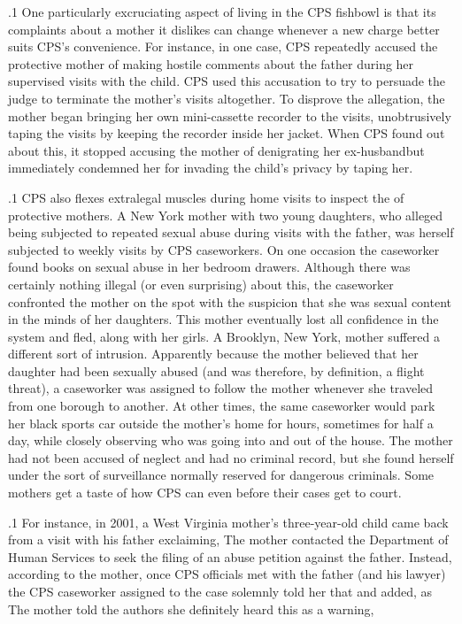\documentclass[11pt, twoside]{article}
\begin{document}
{\p.1{%
One particularly excruciating aspect of living in the CPS fishbowl is
that its complaints about a mother it dislikes can change whenever a new
charge better suits CPS's convenience. For instance, in one case, CPS
repeatedly accused the protective mother of making hostile comments
about the father during her supervised visits with the child. CPS used
this accusation to try to persuade the judge to terminate the mother's visits altogether. To disprove the allegation, the mother began bringing her
own mini-cassette recorder to the visits, unobtrusively taping the visits
by keeping the recorder inside her jacket. When CPS found out about
this, it stopped accusing the mother of denigrating her
ex-husband\mdash{}but immediately condemned her for invading the child's privacy by
taping her.
}%

\p.1{%
CPS also flexes extralegal muscles during home visits to inspect the
 of protective mothers. A New York mother with
two young daughters, who alleged being subjected to repeated sexual
abuse during visits with the father, was herself subjected to weekly  visits by CPS caseworkers. On one occasion the caseworker found
books on sexual abuse in her bedroom drawers. Although there was certainly nothing illegal (or even surprising) about this, the caseworker
confronted the mother on the spot with the suspicion that she was
 sexual content in the minds of her daughters. This mother
eventually lost all confidence in the system and fled, along with her girls.
A Brooklyn, New York, mother suffered a different sort of intrusion.
Apparently because the mother believed that her daughter had
been sexually abused (and was therefore, by definition, a flight threat), a caseworker was assigned to follow the mother whenever she traveled from
one borough to another. At other times, the same caseworker would
park her black sports car outside the mother's home for hours, sometimes for half a day, while closely observing who was going into and
out of the house. The mother had not been accused of neglect and had
no criminal record, but she found herself under the sort of surveillance
normally reserved for dangerous criminals.
Some mothers get a taste of how CPS can  even before
their cases get to court.
}%

\p.1{%
For instance, in 2001, a West Virginia mother's three-year-old child
came back from a visit with his father exclaiming,  The mother contacted the Department of
Human Services to seek the filing of an abuse petition against the father.
Instead, according to the mother, once CPS officials met with the father (and his lawyer) the CPS caseworker assigned to the case solemnly
told her that  and
added,  as  The mother told the authors she definitely heard this as a warning, 
}%


}
\end{document}
